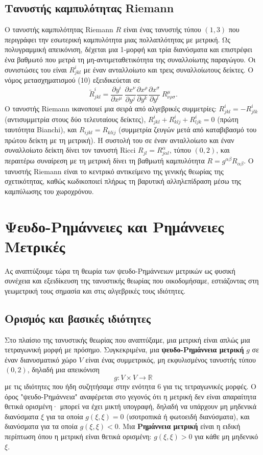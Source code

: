 \documentclass[12pt]{article}
\begin{document}
\subsection{Τανυστής καμπυλότητας Riemann}
Ο τανυστής καμπυλότητας Riemann \( R \) είναι ένας τανυστής τύπου \( (1,3) \) που περιγράφει την εσωτερική καμπυλότητα μιας πολλαπλότητας με μετρική. Ως πολυγραμμική απεικόνιση, δέχεται μια 1-μορφή και τρία διανύσματα και επιστρέφει ένα βαθμωτό που μετρά τη μη-αντιμεταθετικότητα της συναλλοίωτης παραγώγου. Οι συνιστώσες του είναι \( R^i_{jkl} \) με έναν ανταλλοίωτο και τρεις συναλλοίωτους δείκτες. Ο νόμος μετασχηματισμού (10) εξειδικεύεται σε
\[
\tilde{R}^i_{jkl} = \frac{\partial y^i}{\partial x^\mu} \ \frac{\partial x^\nu}{\partial y^j} \frac{\partial x^\rho}{\partial y^k} \frac{\partial x^\sigma}{\partial y^l} \ R^\mu_{\nu\rho\sigma}. \tag{23}
\]
Ο τανυστής Riemann ικανοποιεί μια σειρά από αλγεβρικές συμμετρίες: \( R^i_{jkl} = -R^i_{jlk} \) (αντισυμμετρία στους δύο τελευταίους δείκτες), \( R^i_{jkl} + R^i_{klj} + R^i_{ljk} = 0 \) (πρώτη ταυτότητα Bianchi), και \( R_{ijkl} = R_{klij} \) (συμμετρία ζευγών μετά από καταβιβασμό του πρώτου δείκτη με τη μετρική). Η συστολή του σε έναν ανταλλοίωτο και έναν συναλλοίωτο δείκτη δίνει τον τανυστή Ricci \( R_{jl} = R^\alpha_{j\alpha l} \), τύπου \( (0,2) \), και περαιτέρω συναίρεση με τη μετρική δίνει τη βαθμωτή καμπυλότητα \( R = g^{\alpha\beta} R_{\alpha\beta} \). Ο τανυστής Riemann είναι το κεντρικό αντικείμενο της γενικής θεωρίας της σχετικότητας, καθώς κωδικοποιεί πλήρως τη βαρυτική αλληλεπίδραση μέσω της καμπύλωσης του χωροχρόνου.

\section{Ψευδο-Ρημάννειες και Ρημάννειες Μετρικές}

Ας αναπτύξουμε τώρα τη θεωρία των ψευδο-Ρημάννειων μετρικών ως φυσική συνέχεια και εξειδίκευση της τανυστικής θεωρίας που οικοδομήσαμε, εστιάζοντας στη γεωμετρική τους σημασία και στις αλγεβρικές τους ιδιότητες.

\subsection{Ορισμός και βασικές ιδιότητες}

Στο πλαίσιο της τανυστικής θεωρίας που αναπτύξαμε, μια μετρική είναι απλώς μια τετραγωνική μορφή με πρόσημο. Συγκεκριμένα, μια \textbf{ψευδο-Ρημάννεια μετρική} \( g \) σε έναν διανυσματικό χώρο \( V \) είναι ένας συμμετρικός, μη εκφυλισμένος τανυστής τύπου \( (0,2) \), δηλαδή μια απεικόνιση
\begin{equation}
g: V \times V \to \mathbb{R}
\end{equation}
με τις ιδιότητες που ήδη συζητήσαμε στην ενότητα 6 για τις τετραγωνικές μορφές. Ο όρος "ψευδο-Ρημάννεια" αναφέρεται στο γεγονός ότι η μετρική δεν είναι απαραίτητα θετικά ορισμένη· μπορεί να έχει μικτή υπογραφή, δηλαδή να υπάρχουν μη μηδενικά διανύσματα \( \xi \) για τα οποία \( g(\xi, \xi) = 0 \) (ισοτροπικά ή φωτοειδή διανύσματα), και διανύσματα για τα οποία \( g(\xi, \xi) < 0 \). Μια \textbf{Ρημάννεια μετρική} είναι η ειδική περίπτωση όπου η μετρική είναι θετικά ορισμένη: \( g(\xi, \xi) > 0 \) για κάθε μη μηδενικό \( \xi \).
\end{document}
